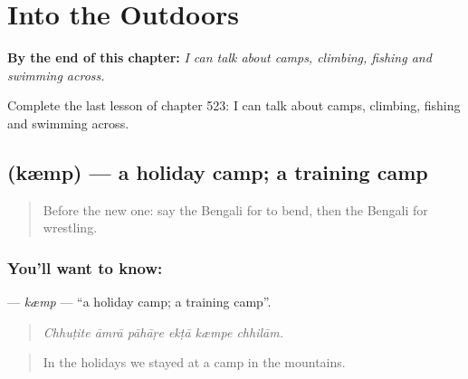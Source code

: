 
\chapter{Into the Outdoors}
\label{ch:bn-into-the-outdoors}

\begin{chapteropening}
\textbf{By the end of this chapter:} \emph{I can talk about camps, climbing, fishing and swimming across.}

Complete the last lesson of chapter 523: I can talk about camps, climbing, fishing and swimming across.
\end{chapteropening}

\section[\texorpdfstring{\bn{ক্যাম্প} (kæmp)}{ক্যাম্প (kæmp)}]{ (kæmp) — a holiday camp; a training camp}

\label{lesson:BN-C523-kemp}



\begin{quote}
Before the new one: say the Bengali for to bend, then the Bengali for wrestling.
\end{quote}

\subsection*{You'll want to know: }
\textbf{} — \emph{kæmp} — \textquotedblleft{}a holiday camp; a training camp\textquotedblright{}.

\begin{quote}
     
\end{quote}

\begin{quote}
\emph{Chhuṭite āmrā pāhāṛe ekṭā kæmpe chhilām.}
\end{quote}

\begin{quote}
In the holidays we stayed at a camp in the mountains.
\end{quote}

